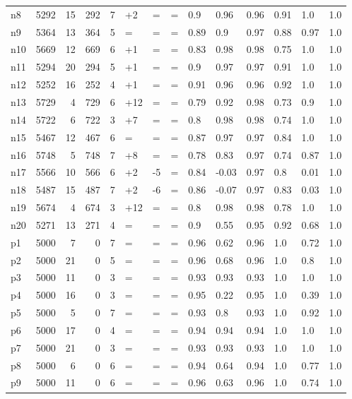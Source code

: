 \begin{tabular}{lrrrllllllllll}
n8 & 5292 & 15 & 292 & 7 & +2 & = & = & 0.9 & 0.96 & 0.96 & 0.91 & 1.0 & 1.0 \\
n9 & 5364 & 13 & 364 & 5 & = & = & = & 0.89 & 0.9 & 0.97 & 0.88 & 0.97 & 1.0 \\
n10 & 5669 & 12 & 669 & 6 & +1 & = & = & 0.83 & 0.98 & 0.98 & 0.75 & 1.0 & 1.0 \\
n11 & 5294 & 20 & 294 & 5 & +1 & = & = & 0.9 & 0.97 & 0.97 & 0.91 & 1.0 & 1.0 \\
n12 & 5252 & 16 & 252 & 4 & +1 & = & = & 0.91 & 0.96 & 0.96 & 0.92 & 1.0 & 1.0 \\
n13 & 5729 & 4 & 729 & 6 & +12 & = & = & 0.79 & 0.92 & 0.98 & 0.73 & 0.9 & 1.0 \\
n14 & 5722 & 6 & 722 & 3 & +7 & = & = & 0.8 & 0.98 & 0.98 & 0.74 & 1.0 & 1.0 \\
n15 & 5467 & 12 & 467 & 6 & = & = & = & 0.87 & 0.97 & 0.97 & 0.84 & 1.0 & 1.0 \\
n16 & 5748 & 5 & 748 & 7 & +8 & = & = & 0.78 & 0.83 & 0.97 & 0.74 & 0.87 & 1.0 \\
n17 & 5566 & 10 & 566 & 6 & +2 & -5 & = & 0.84 & -0.03 & 0.97 & 0.8 & 0.01 & 1.0 \\
n18 & 5487 & 15 & 487 & 7 & +2 & -6 & = & 0.86 & -0.07 & 0.97 & 0.83 & 0.03 & 1.0 \\
n19 & 5674 & 4 & 674 & 3 & +12 & = & = & 0.8 & 0.98 & 0.98 & 0.78 & 1.0 & 1.0 \\
n20 & 5271 & 13 & 271 & 4 & = & = & = & 0.9 & 0.55 & 0.95 & 0.92 & 0.68 & 1.0 \\
p1 & 5000 & 7 & 0 & 7 & = & = & = & 0.96 & 0.62 & 0.96 & 1.0 & 0.72 & 1.0 \\
p2 & 5000 & 21 & 0 & 5 & = & = & = & 0.96 & 0.68 & 0.96 & 1.0 & 0.8 & 1.0 \\
p3 & 5000 & 11 & 0 & 3 & = & = & = & 0.93 & 0.93 & 0.93 & 1.0 & 1.0 & 1.0 \\
p4 & 5000 & 16 & 0 & 3 & = & = & = & 0.95 & 0.22 & 0.95 & 1.0 & 0.39 & 1.0 \\
p5 & 5000 & 5 & 0 & 7 & = & = & = & 0.93 & 0.8 & 0.93 & 1.0 & 0.92 & 1.0 \\
p6 & 5000 & 17 & 0 & 4 & = & = & = & 0.94 & 0.94 & 0.94 & 1.0 & 1.0 & 1.0 \\
p7 & 5000 & 21 & 0 & 3 & = & = & = & 0.93 & 0.93 & 0.93 & 1.0 & 1.0 & 1.0 \\
p8 & 5000 & 6 & 0 & 6 & = & = & = & 0.94 & 0.64 & 0.94 & 1.0 & 0.77 & 1.0 \\
p9 & 5000 & 11 & 0 & 6 & = & = & = & 0.96 & 0.63 & 0.96 & 1.0 & 0.74 & 1.0 \\

\end{tabular}
